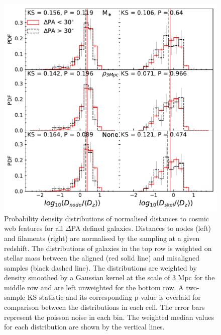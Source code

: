 \begin{figure}
    \centering
	\includegraphics[width=0.85\linewidth]{thesis/latex/halo_assembly_manga/PA_ALL_CW.pdf}
    \caption[Probability density distributions of normalised distances to cosmic web features for all $\Delta$PA defined galaxies.]{Probability density distributions of normalised distances to cosmic web features for all $\Delta$PA defined galaxies. Distances to nodes (left) and filaments (right) are normalised by the sampling at a given redshift. The distributions of galaxies in the top row is weighted on stellar mass between the aligned (red solid line) and misaligned samples (black dashed line). The distributions are weighted by density smoothed by a Gaussian kernel at the scale of 3 Mpc for the middle row and are left unweighted for the bottom row. A two-sample KS statistic and its corresponding p-value is overlaid for comparison between the distributions in each cell. The error bars represent the poisson noise in each bin. The weighted median values for each distribution are shown by the vertical lines.}
    \label{fig:cw_all}
\end{figure}

